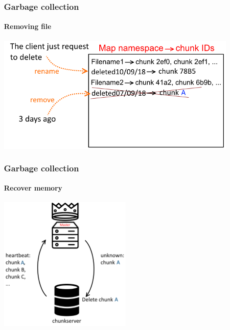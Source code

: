 \documentclass{beamer}
\newcommand{\slideheight}{6.7cm}
\newcommand{\slidewidth}{12cm}
\begin{document}
\begin{frame}
 \frametitle{Garbage collection}
 \framesubtitle{Removing file}
 \centering
 \includegraphics[width=\slidewidth]{figures/removeschema.png}
\end{frame}

\begin{frame}
 \frametitle{Garbage collection}
 \framesubtitle{Recover memory}
 \centering
 \includegraphics[height=\slideheight]{figures/recoverymemoryschema.png}
\end{frame}
\end{document}
